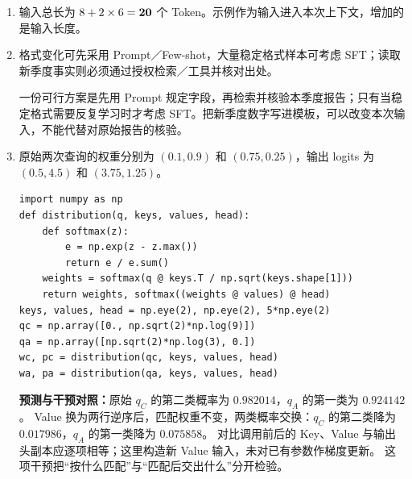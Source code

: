 \begin{enumerate}[label={},leftmargin=4.8em,itemsep=4pt]
\item[\textbf{\hyperref[exercise:icl-context-budget]{C-093.}}] \leavevmode{}\label{solution:C-093}\label{solution:icl-context-budget}输入总长为 $8+2\times6=\boldsymbol{20}$ 个 Token。示例作为输入进入本次上下文，增加的是输入长度。
\item[\textbf{\hyperref[exercise:prompt-or-training]{C-094.}}] \leavevmode{}\label{solution:C-094}\label{solution:prompt-or-training}格式变化可先采用 Prompt／Few-shot，大量稳定格式样本可考虑 SFT；读取新季度事实则必须通过授权检索／工具并核对出处。\par 一份可行方案是先用 Prompt 规定字段，再检索并核验本季度报告；只有当稳定格式需要反复学习时才考虑 SFT。把新季度数字写进模板，可以改变本次输入，不能代替对原始报告的核验。
\item[\textbf{\hyperref[exercise:icl-query-transfer]{C-095.}}] \leavevmode{}\label{solution:C-095}\label{solution:icl-query-transfer}原始两次查询的权重分别为 $(0.1,0.9)$ 和 $(0.75,0.25)$，输出 logits 为 $(0.5,4.5)$ 和 $(3.75,1.25)$。\par\nobreak
\begin{samepage}\begin{verbatim}
import numpy as np
def distribution(q, keys, values, head):
    def softmax(z):
        e = np.exp(z - z.max())
        return e / e.sum()
    weights = softmax(q @ keys.T / np.sqrt(keys.shape[1]))
    return weights, softmax((weights @ values) @ head)
keys, values, head = np.eye(2), np.eye(2), 5*np.eye(2)
qc = np.array([0., np.sqrt(2)*np.log(9)])
qa = np.array([np.sqrt(2)*np.log(3), 0.])
wc, pc = distribution(qc, keys, values, head)
wa, pa = distribution(qa, keys, values, head)
\end{verbatim}\end{samepage}
\textbf{预测与干预对照：}原始 $q_C$ 的第二类概率为 $0.982014$，$q_A$ 的第一类为 $0.924142$。
Value 换为两行逆序后，匹配权重不变，两类概率交换：$q_C$ 的第二类降为 $0.017986$，$q_A$ 的第一类降为 $0.075858$。
对比调用前后的 Key、Value 与输出头副本应逐项相等；这里构造新 Value 输入，未对已有参数作梯度更新。
这项干预把“按什么匹配”与“匹配后交出什么”分开检验。
\end{enumerate}
